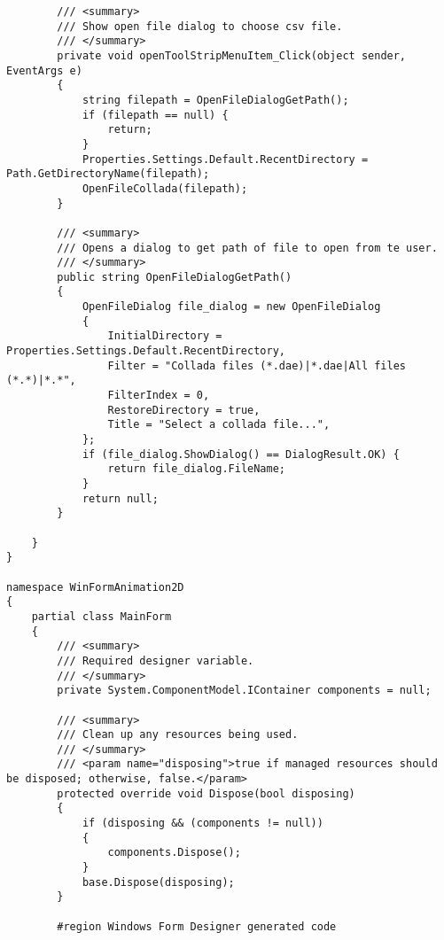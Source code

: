 \begin{scriptsize}
\begin{verbatim}
        /// <summary>
        /// Show open file dialog to choose csv file.
        /// </summary>
        private void openToolStripMenuItem_Click(object sender, EventArgs e)
        {
            string filepath = OpenFileDialogGetPath();
            if (filepath == null) {
                return;
            }
            Properties.Settings.Default.RecentDirectory = Path.GetDirectoryName(filepath);
            OpenFileCollada(filepath);
        }

        /// <summary>
        /// Opens a dialog to get path of file to open from te user.
        /// </summary>
        public string OpenFileDialogGetPath()
        {
            OpenFileDialog file_dialog = new OpenFileDialog
            {
                InitialDirectory = Properties.Settings.Default.RecentDirectory,
                Filter = "Collada files (*.dae)|*.dae|All files (*.*)|*.*",
                FilterIndex = 0,
                RestoreDirectory = true,
                Title = "Select a collada file...",
            };
            if (file_dialog.ShowDialog() == DialogResult.OK) {
                return file_dialog.FileName;
            }
            return null;
        }

    }
}

namespace WinFormAnimation2D
{
    partial class MainForm
    {
        /// <summary>
        /// Required designer variable.
        /// </summary>
        private System.ComponentModel.IContainer components = null;

        /// <summary>
        /// Clean up any resources being used.
        /// </summary>
        /// <param name="disposing">true if managed resources should be disposed; otherwise, false.</param>
        protected override void Dispose(bool disposing)
        {
            if (disposing && (components != null))
            {
                components.Dispose();
            }
            base.Dispose(disposing);
        }

        #region Windows Form Designer generated code


\end{verbatim}
\end{scriptsize}
